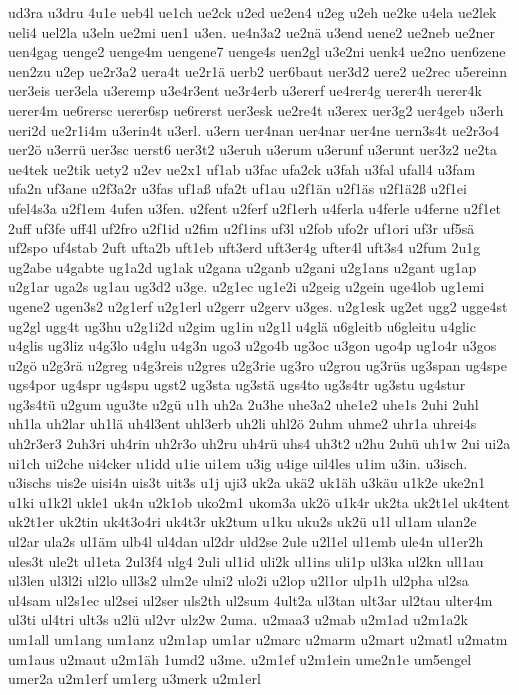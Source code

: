 {ud3ra
u3dru
4u1e
ueb4l
ue1ch
ue2ck
u2ed
ue2en4
u2eg
u2eh
ue2ke
u4ela
ue2lek
ueli4
uel2la
u3eln
ue2mi
uen1
u3en.
ue4n3a2
ue2nä
u3end
uene2
ue2neb
ue2ner
uen4gag
uenge2
uenge4m
uengene7
uenge4s
uen2gl
u3e2ni
uenk4
ue2no
uen6zene
uen2zu
u2ep
ue2r3a2
uera4t
ue2r1ä
uerb2
uer6baut
uer3d2
uere2
ue2rec
u5ereinn
uer3eis
uer3ela
u3eremp
u3e4r3ent
ue3r4erb
u3ererf
ue4rer4g
uerer4h
uerer4k
uerer4m
ue6rersc
uerer6sp
ue6rerst
uer3esk
ue2re4t
u3erex
uer3g2
uer4geb
u3erh
ueri2d
ue2r1i4m
u3erin4t
u3erl.
u3ern
uer4nan
uer4nar
uer4ne
uern3s4t
ue2r3o4
uer2ö
u3errü
uer3sc
uerst6
uer3t2
u3eruh
u3erum
u3erunf
u3erunt
uer3z2
ue2ta
ue4tek
ue2tik
uety2
u2ev
ue2x1
uf1ab
u3fac
ufa2ck
u3fah
u3fal
ufall4
u3fam
ufa2n
uf3ane
u2f3a2r
u3fas
uf1aß
ufa2t
uf1au
u2f1än
u2f1äs
u2f1ä2ß
u2f1ei
ufel4s3a
u2f1em
4ufen
u3fen.
u2fent
u2ferf
u2f1erh
u4ferla
u4ferle
u4ferne
u2f1et
2uff
uf3fe
uff4l
uf2fro
u2f1id
u2fim
u2f1ins
uf3l
u2fob
ufo2r
uf1ori
uf3r
uf5sä
uf2spo
uf4stab
2uft
ufta2b
uft1eb
uft3erd
uft3er4g
ufter4l
uft3s4
u2fum
2u1g
ug2abe
u4gabte
ug1a2d
ug1ak
u2gana
u2ganb
u2gani
u2g1ans
u2gant
ug1ap
u2g1ar
uga2s
ug1au
ug3d2
u3ge.
u2g1ec
ug1e2i
u2geig
u2gein
uge4lob
ug1emi
ugene2
ugen3s2
u2g1erf
u2g1erl
u2gerr
u2gerv
u3ges.
u2g1esk
ug2et
ugg2
ugge4st
ug2gl
ugg4t
ug3hu
u2g1i2d
u2gim
ug1in
u2g1l
u4glä
u6gleitb
u6gleitu
u4glic
u4glis
ug3liz
u4g3lo
u4glu
u4g3n
ugo3
u2go4b
ug3oc
u3gon
ugo4p
ug1o4r
u3gos
u2gö
u2g3rä
u2greg
u4g3reis
u2gres
u2g3rie
ug3ro
u2grou
ug3rüs
ug3span
ug4spe
ugs4por
ug4spr
ug4spu
ugst2
ug3sta
ug3stä
ugs4to
ug3s4tr
ug3stu
ug4stur
ug3s4tü
u2gum
ugu3te
u2gü
u1h
uh2a
2u3he
uhe3a2
uhe1e2
uhe1s
2uhi
2uhl
uh1la
uh2lar
uh1lä
uh4l3ent
uhl3erb
uh2li
uhl2ö
2uhm
uhme2
uhr1a
uhrei4s
uh2r3er3
2uh3ri
uh4rin
uh2r3o
uh2ru
uh4rü
uhs4
uh3t2
u2hu
2uhü
uh1w
2ui
ui2a
ui1ch
ui2che
ui4cker
u1idd
u1ie
ui1em
u3ig
u4ige
uil4les
u1im
u3in.
u3isch.
u3ischs
uis2e
uisi4n
uis3t
uit3s
u1j
uji3
uk2a
ukä2
uk1äh
u3käu
u1k2e
uke2n1
u1ki
u1k2l
ukle1
uk4n
u2k1ob
uko2m1
ukom3a
uk2ö
u1k4r
uk2ta
uk2t1el
uk4tent
uk2t1er
uk2tin
uk4t3o4ri
uk4t3r
uk2tum
u1ku
uku2s
uk2ü
u1l
ul1am
ulan2e
ul2ar
ula2s
ul1äm
ulb4l
ul4dan
ul2dr
uld2se
2ule
u2l1el
ul1emb
ule4n
ul1er2h
ules3t
ule2t
ul1eta
2ul3f4
ulg4
2uli
ul1id
uli2k
ul1ins
uli1p
ul3ka
ul2kn
ull1au
ul3len
ul3l2i
ul2lo
ull3s2
ulm2e
ulni2
ulo2i
u2lop
u2l1or
ulp1h
ul2pha
ul2sa
ul4sam
ul2s1ec
ul2sei
ul2ser
uls2th
ul2sum
4ult2a
ul3tan
ult3ar
ul2tau
ulter4m
ul3ti
ul4tri
ult3s
u2lü
ul2vr
ulz2w
2uma.
u2maa3
u2mab
u2m1ad
u2m1a2k
um1all
um1ang
um1anz
u2m1ap
um1ar
u2marc
u2marm
u2mart
u2matl
u2matm
um1aus
u2maut
u2m1äh
1umd2
u3me.
u2m1ef
u2m1ein
ume2n1e
um5engel
umer2a
u2m1erf
um1erg
u3merk
u2m1erl
}
